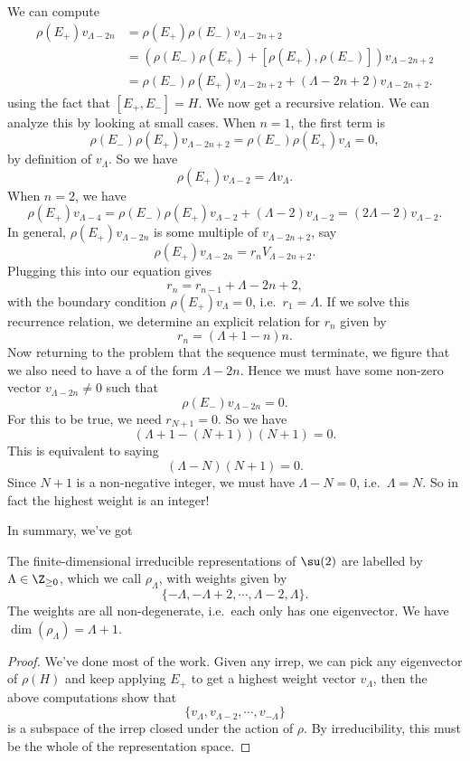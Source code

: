 \documentclass[a4paper]{article}
\begin{document}
We can compute
\begin{align*}
  \rho(E_+) v_{\Lambda - 2n} &= \rho(E_+) \rho(E_-) v_{\Lambda - 2n + 2} \\
  &= (\rho(E_-)\rho(E_+) + [\rho(E_+), \rho(E_-)]) v_{\Lambda - 2n + 2} \\
  &= \rho(E_-) \rho(E_+) v_{\Lambda - 2n + 2} + (\Lambda - 2n + 2)v_{\Lambda - 2n + 2}.
\end{align*}
using the fact that $[E_+, E_-] = H$. We now get a recursive relation. We can analyze this by looking at small cases. When $n = 1$, the first term is
\[
  \rho(E_-)\rho(E_+) v_{\Lambda - 2n + 2} = \rho(E_-) \rho(E_+) v_\Lambda = 0,
\]
by definition of $v_\Lambda$. So we have
\[
  \rho(E_+) v_{\Lambda - 2} = \Lambda v_\Lambda.
\]
When $n = 2$, we have
\[
  \rho(E_+) v_{\Lambda - 4} = \rho(E_-) \rho(E_+) v_{\Lambda - 2} + (\Lambda - 2) v_{\Lambda - 2} = (2\Lambda - 2) v_{\Lambda - 2}.
\]
In general, $\rho(E_+)v_{\Lambda - 2n}$ is some multiple of $v_{\Lambda - 2n + 2}$, say
\[
  \rho(E_+) v_{\Lambda - 2n} = r_n V_{\Lambda - 2n + 2}.
\]
Plugging this into our equation gives
\[
  r_n = r_{n - 1} + \Lambda - 2n + 2,
\]
with the boundary condition $\rho(E_+)v_\Lambda = 0$, i.e.\ $r_1 = \Lambda$. If we solve this recurrence relation, we determine an explicit relation for $r_n$ given by
\[
  r_n = (\Lambda + 1 - n)n.
\]
Now returning to the problem that the sequence must terminate, we figure that we also need to have a  of the form $\Lambda - 2n$. Hence we must have some non-zero vector $v_{\Lambda - 2n} \not= 0$ such that
\[
  \rho(E_-) v_{\Lambda - 2n} = 0.
\]
For this to be true, we need $r_{N + 1} = 0$. So we have
\[
  (\Lambda + 1 - (N + 1))(N + 1) = 0.
\]
This is equivalent to saying
\[
  (\Lambda - N)(N + 1) = 0.
\]
Since $N + 1$ is a non-negative integer, we must have $\Lambda - N = 0$, i.e.\ $\Lambda = N$. So in fact the highest weight is an integer!

In summary, we've got
\begin{prop}
  The finite-dimensional irreducible representations of $\su(2)$ are labelled by $\Lambda \in \Z_{\geq 0}$, which we call $\rho_\Lambda$, with weights given by
  \[
    \{-\Lambda, -\Lambda + 2, \cdots, \Lambda - 2, \Lambda\}.
  \]
  The weights are all non-degenerate, i.e.\ each only has one eigenvector. We have $\dim (\rho_\Lambda) = \Lambda + 1$.
\end{prop}

\begin{proof}
  We've done most of the work. Given any irrep, we can pick any eigenvector of $\rho(H)$ and keep applying $E_+$ to get a highest weight vector $v_\Lambda$, then the above computations show that
  \[
    \{v_\Lambda, v_{\Lambda - 2}, \cdots, v_{-\Lambda}\}
  \]
  is a subspace of the irrep closed under the action of $\rho$. By irreducibility, this must be the whole of the representation space.
\end{proof}
\end{document}
